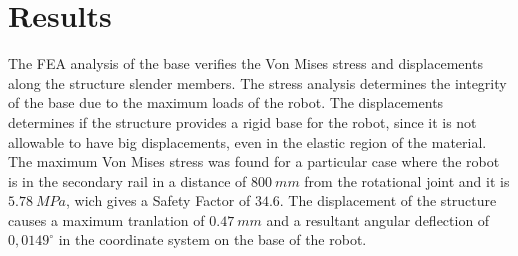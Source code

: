 \section{Results}





The FEA analysis of the base verifies the Von Mises stress and displacements
along the structure slender members. The stress analysis determines the
integrity of the base due to the maximum loads of the robot. The displacements
determines if the structure provides a rigid base for the robot, since it is not
allowable to have big displacements, even in the elastic region of the material.
The maximum Von Mises stress was found for a particular case where the robot is
in the secondary rail in a distance of $800~mm$ from the rotational joint and
it is $5.78~MPa$, wich gives a Safety Factor of $34.6$. 
The displacement of the structure causes a maximum tranlation of $0.47~mm$ and a
resultant angular deflection of $0,0149^{\circ}$ in the coordinate system on
the base of the robot.


